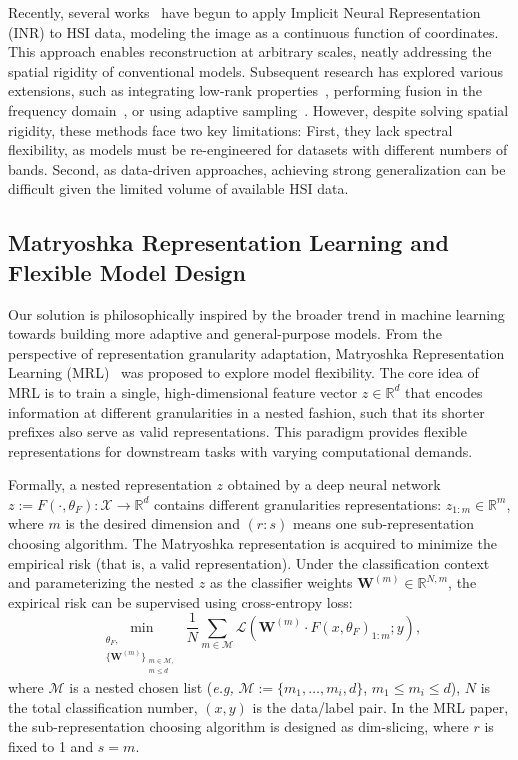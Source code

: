 Recently, several works~\cite{zhang2022implicit,chen2023spectral} have begun to apply Implicit Neural Representation (INR) to HSI data, modeling the image as a continuous function of coordinates. This approach enables reconstruction at arbitrary scales, neatly addressing the spatial rigidity of conventional models. Subsequent research has explored various extensions, such as integrating low-rank properties~\cite{wang2025hyperspectral}, performing fusion in the frequency domain~\cite{liang2024fourier}, or using adaptive sampling~\cite{deng2025otias}. However, despite solving spatial rigidity, these methods face two key limitations: First, they lack spectral flexibility, as models must be re-engineered for datasets with different numbers of bands. Second, as data-driven approaches, achieving strong generalization can be difficult given the limited volume of available HSI data.

\subsection{Matryoshka Representation Learning and Flexible Model Design}
Our solution is philosophically inspired by the broader trend in machine learning towards building more adaptive and general-purpose models. From the perspective of representation granularity adaptation, Matryoshka Representation Learning (MRL)~\cite{kusupati2022matryoshka,hojjat2025thinkingvit,cappellazzo2025mome} was proposed to explore model flexibility. The core idea of MRL is to train a single, high-dimensional feature vector $z \in \mathbb R^d$ that encodes information at different granularities in a nested fashion, such that its shorter prefixes also serve as valid representations. This paradigm provides flexible representations for downstream tasks with varying computational demands.

Formally, a nested representation $z$ obtained by a deep neural network $z:=F(\cdot,\theta_F): \mathcal X\to \mathbb R^d$ contains different granularities representations: $z_{1:m}\in \mathbb R^m$, where $m$ is the desired dimension and $(r:s)$ means one sub-representation choosing algorithm. The Matryoshka representation is acquired to minimize the empirical risk (that is, a valid representation). Under the classification context and parameterizing the nested $z$ as the classifier weights $\mathbf W^{(m)} \in \mathbb R^{N, m}$, the expirical risk can be supervised using cross-entropy loss:
\begin{equation}
    \min_{\substack{\theta_F, \\ \{\mathbf W^{(m)}\}_{\substack{m\in \mathcal M, \\ m\leq d}}}}\frac{1}{N} \sum_{m \in \mathcal M} \mathcal L\left(\mathbf W^{(m)} \cdot F(x,\theta_F)_{1:m}; y \right), \label{eq:mrl-loss}
\end{equation}
where $\mathcal M$ is a nested chosen list (\textit{e.g,} $\mathcal M:=\{m_1,\dots,m_i,d\}$, $m_1\leq m_i\leq d$), $N$ is the total classification number, $(x,y)$ is the data/label pair. In the MRL paper, the sub-representation choosing algorithm is designed as dim-slicing, where $r$ is fixed to 1 and $s=m$.

